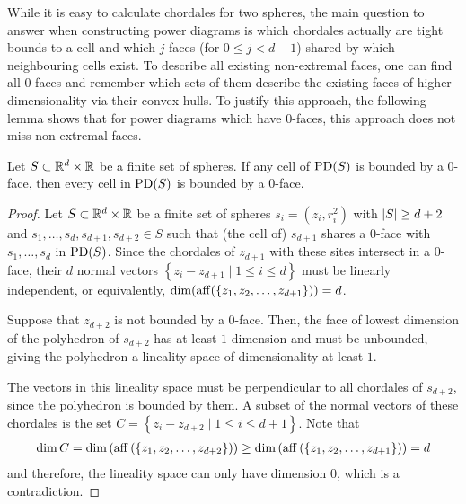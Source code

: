 While it is easy to calculate chordales for two spheres, the main question to answer when constructing power diagrams is which chordales actually are tight bounds to a cell and which $j$-faces (for $0 \leq j < d - 1$) shared by which neighbouring cells exist.
To describe all existing non-extremal faces, one can find all $0$-faces and remember which sets of them describe the existing faces of higher dimensionality via their convex hulls.
To justify this approach, the following lemma shows that for power diagrams which have $0$-faces, this approach does not miss non-extremal faces.

\begin{lemma}
    \label{lem:zerofaces}
    Let $S \subset \mathbb{R}^d \times \mathbb{R}$ be a finite set of spheres.
    If any cell of $\operatorname{PD}(S)$ is bounded by a $0$-face, then every cell in $\operatorname{PD}(S)$ is bounded by a $0$-face.
\end{lemma}
\begin{proof}
    Let $S \subset \mathbb{R}^d \times \mathbb{R}$ be a finite set of spheres $s_i = (z_i, r_i^2)$ with $\left\vert S \right\vert \geq d+2$ and $s_1, \dots, s_d, s_{d+1}, s_{d+2} \in S$ such that (the cell of) $s_{d+1}$ shares a $0$-face with $s_1, \dots, s_d$ in $\operatorname{PD}(S)$.
    Since the chordales of $z_{d+1}$ with these sites intersect in a $0$-face, their $d$ normal vectors $\left\{  z_i - z_{d+1} \mid 1 \leq i \leq d\right\}$ must be linearly independent, or equivalently, $\dim(\operatorname{aff}(\left\{ z_1, z_2, \dots, z_{d+1} \right\})) = d$.

    Suppose that $z_{d+2}$ is not bounded by a $0$-face.
    Then, the face of lowest dimension of the polyhedron of $s_{d+2}$ has at least $1$ dimension and must be unbounded, giving the polyhedron a lineality space of dimensionality at least $1$.

    The vectors in this lineality space must be perpendicular to all chordales of $s_{d+2}$, since the polyhedron is bounded by them.
    A subset of the normal vectors of these chordales is the set $C = \left\{ z_i - z_{d+2} \mid 1 \leq i \leq d+1 \right\}$.
    Note that
    \begin{align}
        \dim C = \dim \left( \operatorname{aff} \left( \left\{ z_1, z_2, \dots, z_{d+2} \right\} \right) \right) \geq \dim \left( \operatorname{aff} \left( \left\{ z_1, z_2, \dots, z_{d+1} \right\} \right) \right) = d
    \end{align}
    and therefore, the lineality space can only have dimension $0$, which is a contradiction.
\end{proof}

